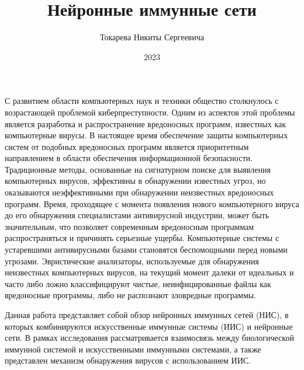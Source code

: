 \documentclass[bachelor, och, referat]{template}
\begin{document}
\title{Нейронные иммунные сети}





\author{Токарева Никиты Сергеевича}




\date{2023}

\maketitle



\tableofcontents

\intro
С развитием области компьютерных наук и техники общество столкнулось с 
возрастающей проблемой киберпреступности. Одним из аспектов этой проблемы 
является разработка и распространение вредоносных программ, известных как 
компьютерные вирусы. В настоящее время обеспечение защиты компьютерных 
систем от подобных вредоносных программ является приоритетным направлением 
в области обеспечения информационной безопасности. Традиционные методы, 
основанные на сигнатурном поиске для выявления компьютерных вирусов, 
эффективны в обнаружении известных угроз, но оказываются неэффективными 
при обнаружении неизвестных вредоносных программ. Время, проходящее с 
момента появления нового компьютерного вируса до его обнаружения 
специалистами антивирусной индустрии, может быть значительным, 
что позволяет современным вредоносным программам распространяться 
и причинять серьезные ущербы. Компьютерные системы с устаревшими 
антивирусными базами становятся беспомощными перед новыми угрозами. 
Эвристические анализаторы, используемые для обнаружения неизвестных 
компьютерных вирусов, на текущий момент далеки от идеальных и часто 
либо ложно классифицируют чистые, неинфицированные файлы как вредоносные 
программы, либо не распознают зловредные программы.

Данная работа представляет собой обзор нейронных иммунных сетей (НИС), в 
которых комбинируются искусственные иммунные системы (ИИС) и нейронные 
сети. В рамках исследования рассматривается взаимосвязь между биологической 
иммунной системой и искусственными иммунными системами, а также представлен 
механизм обнаружения вирусов с использованием ИИС.
\end{document}

